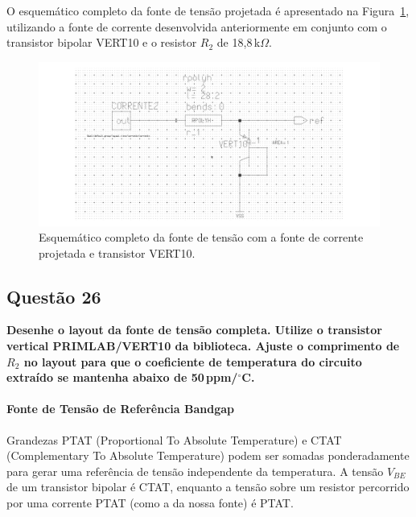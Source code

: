 \documentclass[12pt,a4paper]{article}
\newcommand{\degree}{\ensuremath{{}^\circ}}
\begin{document}
O esquemático completo da fonte de tensão projetada é apresentado na Figura~\ref{fig:esquematico25}, utilizando a fonte de corrente desenvolvida anteriormente em conjunto com o transistor bipolar VERT10 e o resistor $R_2$ de 18{,}8\,k$\Omega$.

\begin{figure}[H]
    \centering
    \includegraphics[width=1\textwidth]{esquematico25.png}
    \caption{Esquemático completo da fonte de tensão com a fonte de corrente projetada e transistor VERT10.}
    \label{fig:esquematico25}
\end{figure}



\subsection*{Questão 26}

	\textbf{Desenhe o layout da fonte de tensão completa. Utilize o transistor vertical PRIMLAB/VERT10 da biblioteca. Ajuste o comprimento de $R_2$ no layout para que o coeficiente de temperatura do circuito extraído se mantenha abaixo de 50\,ppm/\degree C.}


\paragraph*{Fonte de Tensão de Referência Bandgap}

Grandezas PTAT (Proportional To Absolute Temperature) e CTAT (Complementary To Absolute Temperature) podem ser somadas ponderadamente para gerar uma referência de tensão independente da temperatura. A tensão $V_{BE}$ de um transistor bipolar é CTAT, enquanto a tensão sobre um resistor percorrido por uma corrente PTAT (como a da nossa fonte) é PTAT.
\end{document}
